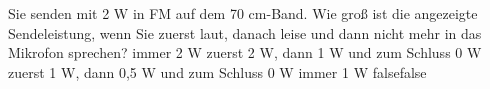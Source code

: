     {Sie senden mit 2 W in FM auf dem 70 cm-Band. Wie groß ist die angezeigte Sendeleistung, wenn Sie zuerst laut, danach leise und dann nicht mehr in das Mikrofon sprechen?}
    {immer 2 W}
    {zuerst 2 W, dann 1 W und zum Schluss 0 W}
    {zuerst 1 W, dann 0,5 W und zum Schluss 0 W}
    {immer 1 W}
    {false}{false}